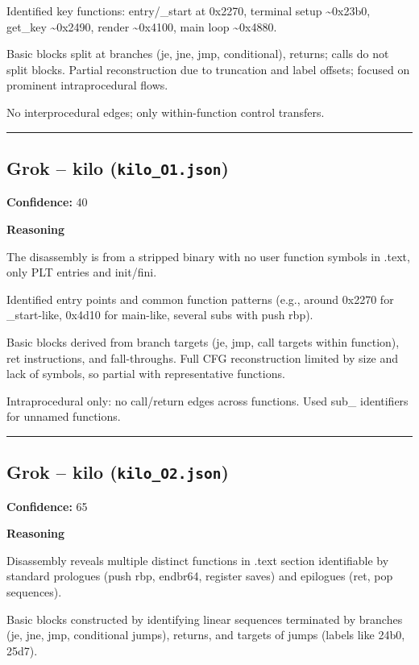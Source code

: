 Identified key functions: entry/\_start at 0x2270, terminal setup \textasciitilde{}0x23b0, get\_key \textasciitilde{}0x2490, render \textasciitilde{}0x4100, main loop \textasciitilde{}0x4880.

Basic blocks split at branches (je, jne, jmp, conditional), returns; calls do not split blocks. Partial reconstruction due to truncation and label offsets; focused on prominent intraprocedural flows.

No interprocedural edges; only within-function control transfers.

\bigskip
\hrule
\bigskip

\subsection{Grok -- kilo (\texttt{kilo\_O1.json})}

\textbf{Confidence:} 40

\textbf{Reasoning}

The disassembly is from a stripped binary with no user function symbols in .text, only PLT entries and init/fini.

Identified entry points and common function patterns (e.g., around 0x2270 for \_start-like, 0x4d10 for main-like, several subs with push rbp).

Basic blocks derived from branch targets (je, jmp, call targets within function), ret instructions, and fall-throughs. Full CFG reconstruction limited by size and lack of symbols, so partial with representative functions.

Intraprocedural only: no call/return edges across functions. Used sub\_ identifiers for unnamed functions.

\bigskip
\hrule
\bigskip

\subsection{Grok -- kilo (\texttt{kilo\_O2.json})}

\textbf{Confidence:} 65

\textbf{Reasoning}

Disassembly reveals multiple distinct functions in .text section identifiable by standard prologues (push rbp, endbr64, register saves) and epilogues (ret, pop sequences).

Basic blocks constructed by identifying linear sequences terminated by branches (je, jne, jmp, conditional jumps), returns, and targets of jumps (labels like 24b0, 25d7).

